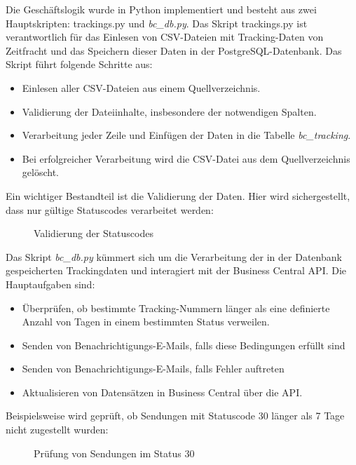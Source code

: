 Die Geschäftslogik wurde in Python implementiert und besteht aus zwei Hauptskripten: trackings.py und \textit{bc\_db.py}. 
Das Skript trackings.py ist verantwortlich für das Einlesen von CSV-Dateien mit Tracking-Daten von Zeitfracht und das 
Speichern dieser Daten in der PostgreSQL-Datenbank. Das Skript führt folgende Schritte aus:
\begin{itemize}
    \item Einlesen aller CSV-Dateien aus einem Quellverzeichnis.
    \item Validierung der Dateiinhalte, insbesondere der notwendigen Spalten.
    \item Verarbeitung jeder Zeile und Einfügen der Daten in die Tabelle \textit{bc\_tracking}.
    \item Bei erfolgreicher Verarbeitung wird die CSV-Datei aus dem Quellverzeichnis gelöscht.
\end{itemize}


Ein wichtiger Bestandteil ist die Validierung der Daten. Hier wird sichergestellt, dass nur gültige
Statuscodes verarbeitet werden:	

\begin{figure}[htb]
    \centering
    \caption{Validierung der Statuscodes}
    \label{fig:validateRow}
\end{figure}

Das Skript \textit{bc\_db.py} kümmert sich um die Verarbeitung der in der Datenbank gespeicherten Trackingdaten und 
interagiert mit der Business Central API. 
Die Hauptaufgaben sind:

\begin{itemize}
    \item Überprüfen, ob bestimmte Tracking-Nummern länger als eine definierte Anzahl von Tagen in einem bestimmten Status verweilen.
    \item Senden von Benachrichtigungs-E-Mails, falls diese Bedingungen erfüllt sind
    \item Senden von Benachrichtigungs-E-Mails, falls Fehler auftreten
    \item Aktualisieren von Datensätzen in Business Central über die API.
\end{itemize}


Beispielsweise wird geprüft, ob Sendungen mit Statuscode 30 länger als 7 Tage nicht zugestellt wurden:

\begin{figure}[htb]
    \centering
    \caption{Prüfung von Sendungen im Status 30}
    \label{fig:viewStatus}
\end{figure}


